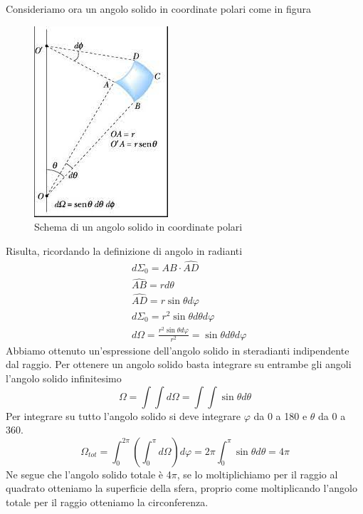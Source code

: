 \documentclass[
10pt, %
a4paper, %
oneside, %
headinclude,footinclude, %
BCOR5mm, %
]{scrartcl}
\begin{document}
Consideriamo ora un angolo solido in coordinate polari come in figura 
\begin{figure}[h!]
	\centering
	\includegraphics[width=0.3\linewidth]{images/angolo_solido}
	\caption{Schema di un angolo solido in coordinate polari}
	\label{fig:angolosolido}
\end{figure}
\FloatBarrier
Risulta, ricordando la definizione di angolo in radianti
\begin{align*}
	&d\Sigma_0 = \hat{AB}\cdot\hat{AD}\\
	&\hat{AB}=rd\theta\\
	&\hat{AD}=r\sin\theta d\varphi\\
	&d\Sigma_0 = r^2\sin\theta d\theta d\varphi\\
	&d\Omega = \frac{r^2 \sin\theta d\varphi}{r^2} = \sin\theta d\theta d\varphi
\end{align*}
Abbiamo ottenuto un'espressione dell'angolo solido in steradianti indipendente dal raggio. Per ottenere un angolo solido basta integrare su entrambe gli angoli l'angolo solido infinitesimo
\[\Omega = \int\int d\Omega = \int \int \sin\theta d\theta\]
Per integrare su tutto l'angolo solido si deve integrare \(\varphi\) da 0 a 180 e $\theta$ da 0 a 360. 
\[\Omega_{tot} = \int^{2\pi}_{0}\left(\int^{\pi}_{0} d\Omega\right)d\varphi = 2\pi \int^\pi_{0} \sin\theta d\theta = 4\pi\]
Ne segue che l'angolo solido totale è 4$\pi$, se lo moltiplichiamo per il raggio al quadrato otteniamo la superficie della sfera, proprio come moltiplicando l'angolo totale per il raggio otteniamo la circonferenza.\\\\
\end{document}
